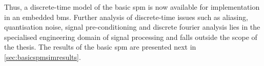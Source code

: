 Thus,  a  discrete-time model  of  the  basic  \gls{spm}  is now  available  for
implementation  in  an embedded  \gls{bms}.  Further  analysis of  discrete-time
issues  such  as  aliasing,  quantisation  noise,  signal  pre-conditioning  and
discrete fourier analysis  lies in the specialised engineering  domain of signal
processing and falls outside  the scope of the thesis. The  results of the basic
\gls{spm} are presented next in \cref{sec:basicspmsimresults}.







